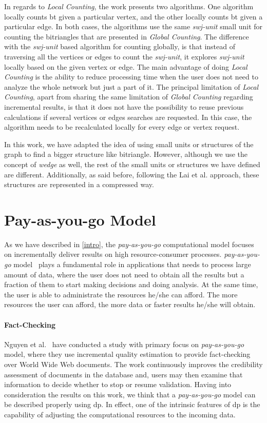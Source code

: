 In regards to \emph{Local Counting}, the work presents two algorithms. One algorithm locally counts \acrshort{bt} given a particular vertex, and the other locally counts \acrshort{bt} given a particular edge. 
In both cases, the algorithms use the same \emph{swj-unit} small unit for counting the bitriangles that are presented in \emph{Global Counting}. The difference with the \emph{swj-unit} based algorithm for counting globally, is that instead of traversing all the vertices or edges to count the \emph{swj-unit}, it explores \emph{swj-unit} locally based on the given vertex or edge.
The main advantage of doing \emph{Local Counting} is the ability to reduce processing time when the user does not need to analyze the whole network but just a part of it.
The principal limitation of \emph{Local Counting}, apart from sharing the same limitation of \emph{Global Counting} regarding incremental results, is that it does not have the possibility to reuse previous calculations if several vertices or edges searches are requested. 
In this case, the algorithm needs to be recalculated locally for every edge or vertex request.

In this work, we have adapted the idea of using small units or structures of the graph to find a bigger structure like bitriangle. However, although we use the concept of \emph{wedge} as well, the rest of the small  units or structures we have defined are different. Additionally, as said before, following the Lai et al. approach, these structures are represented in a compressed way. 


\section{Pay-as-you-go Model}
As we have described in \autoref{intro}, the \emph{pay-as-you-go} computational model focuses on incrementally deliver results on high resource-consumer processes.
\emph{pay-as-you-go} model~\cite{factcatch} plays a fundamental role in applications that needs to process large amount of data, where the user does not need to obtain all the results but a fraction of them to start making decisions and doing analysis.
At the same time, the user is able to administrate the resources he/she can afford. The more resources the user can afford, the more data or faster results he/she will obtain.

\paragraph{Fact-Checking} Nguyen et al.~\cite{factcatch} have conducted a study with primary focus on \emph{pay-as-you-go} model, where they use incremental quality estimation to provide fact-checking over World Wide Web documents.
The work continuously improves the credibility assessment of documents in the database and, users may then examine that information to decide whether to stop or resume validation.
Having into consideration the results on this work, we think  that a \emph{pay-as-you-go} model can be described properly using \acrlong{dp}. In effect, one of the intrinsic features of \acrshort{dp} is the capability of adjusting the computational resources to the incoming data. 

